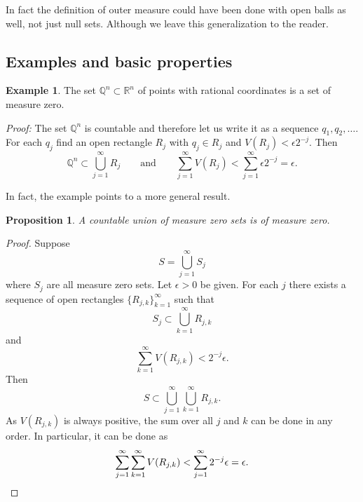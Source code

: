 \documentclass[12pt]{book}
\newcommand{\R}{{\mathbb{R}}}
\newcommand{\Q}{{\mathbb{Q}}}
\theoremstyle{plain}
\newtheorem{prop}[thm]{Proposition}
\theoremstyle{remark}
\theoremstyle{definition}
\theoremstyle{exercise}
\theoremstyle{example}
\newtheorem{example}[thm]{Example}
\begin{document}
In fact the definition of outer measure could have been done with open balls
as well, not just null sets.  Although we leave this generalization to the reader.

\subsection{Examples and basic properties}

\begin{example}
The set $\Q^n \subset \R^n$ of points with rational coordinates
is a set of measure zero.

\emph{Proof:}
The set $\Q^n$ is countable and therefore let us write it
as a sequence $q_1,q_2,\ldots$.  For each $q_j$ find an open rectangle
$R_j$ with $q_j \in R_j$ and $V(R_j) < \epsilon 2^{-j}$.  Then
\begin{equation*}
\Q^n \subset \bigcup_{j=1}^\infty R_j \qquad \text{and} \qquad
\sum_{j=1}^\infty V(R_j) <
\sum_{j=1}^\infty \epsilon 2^{-j} = \epsilon .
\end{equation*}
\end{example}

In fact, the example points to a more general result.

\begin{prop}
A countable union of measure zero sets is of measure zero.
\end{prop}

\begin{proof}
Suppose
\begin{equation*}
S = \bigcup_{j=1}^\infty S_j
\end{equation*}
where $S_j$ are all measure zero sets.  Let $\epsilon > 0$ be given.
For each $j$
there exists a sequence of open rectangles $\{ R_{j,k} \}_{k=1}^\infty$
such that
\begin{equation*}
S_j \subset \bigcup_{k=1}^\infty R_{j,k}
\end{equation*}
and 
\begin{equation*}
\sum_{k=1}^\infty V(R_{j,k}) < 2^{-j} \epsilon .
\end{equation*}
Then
\begin{equation*}
S \subset \bigcup_{j=1}^\infty \bigcup_{k=1}^\infty R_{j,k} .
\end{equation*}
As $V(R_{j,k})$ is always positive, the sum over all $j$ and $k$
can be done in any order.  In particular, it can be done as
\begin{equation*}
\sum_{j=1}^\infty \sum_{k=1}^\infty V(R_{j,k}) <
\sum_{j=1}^\infty 2^{-j} \epsilon = \epsilon . \qedhere
\end{equation*}
\end{proof}
\end{document}
